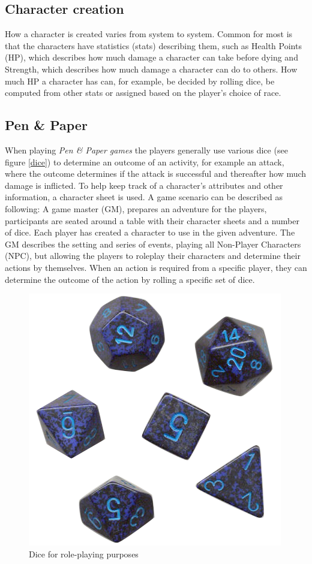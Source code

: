\subsection{Character creation}

How a character is created varies from system to system. Common for most is that the characters have statistics (stats) describing them, such as Health Points (HP), which describes how much damage a character can take before dying and Strength, which describes how much damage a character can do to others. How much HP a character has can, for example, be decided by rolling dice, be computed from other stats or assigned based on the player's choice of race.

\subsection*{Pen \& Paper}
When playing \emph{Pen \& Paper games} the players generally use various dice (see figure \vref{dice}) to determine an outcome of an activity, for example an attack, where the outcome determines if the attack is successful and thereafter how much damage is inflicted. To help keep track of a character's attributes and other information, a character sheet is used.
A game scenario can be described as following: A game master (GM), prepares an adventure for the players, participants are seated around a table with their character sheets and a number of dice. Each player has created a character to use in the given adventure. The GM describes the setting and series of events, playing all Non-Player Characters (NPC), but allowing the players to roleplay their characters and determine their actions by themselves. When an action is required from a specific player, they can determine the outcome of the action by rolling a specific set of dice.

\begin{figure}[!h]
\centering
\includegraphics[scale=0.35]{img/rpgdice.png}
\caption{Dice for role-playing purposes}
\label{dice}
\end{figure}

